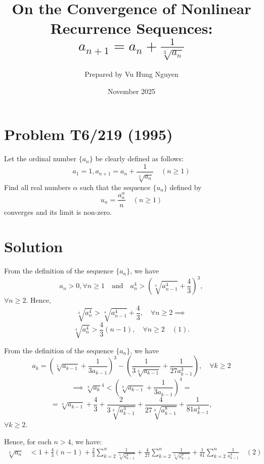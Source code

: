 \documentclass{article}
\title{On the Convergence of Nonlinear Recurrence Sequences:\\ $a_{n+1} = a_n + \frac{1}{\sqrt[3]{a_n}}$}
\author{Prepared by Vu Hung Nguyen}
\date{November 2025}
\begin{document}
\maketitle


\vspace{0.5cm}


\section{Problem T6/219 (1995)}

Let the ordinal number $\{a_n\}$ be clearly defined as follows:
$$ a_1 = 1, a_{n+1} = a_n + \frac{1}{\sqrt[3]{a_n}} \quad (n \ge 1) $$
Find all real numbers $\alpha$ such that the sequence $\{u_n\}$ defined by
$$ u_n = \frac{a_n^\alpha}{n} \quad (n \ge 1) $$
converges and its limit is non-zero.

\section*{Solution}
From the definition of the sequence $\{a_n\}$, we have
$$ a_n > 0, \forall n \ge 1 \quad \text{and} \quad a_n^4 > \left(\sqrt[4]{a_{n-1}^4} + \frac{4}{3}\right)^3, $$
$\forall n \ge 2$. Hence,
$$ \sqrt[4]{a_n^4} > \sqrt[4]{a_{n-1}^4} + \frac{4}{3}, \quad \forall n \ge 2 \implies $$
$$ \sqrt[4]{a_n^4} > \frac{4}{3}(n-1), \quad \forall n \ge 2 \quad (1). $$

From the definition of the sequence $\{a_n\}$, we have
$$ a_k = \left(\sqrt[3]{a_{k-1}} + \frac{1}{3a_{k-1}}\right)^3 - \left(\frac{1}{3\sqrt[3]{a_{k-1}}} + \frac{1}{27a_{k-1}^3}\right), \quad \forall k \ge 2 $$
$$\implies \sqrt[3]{a_k}^4 < \left(\sqrt[3]{a_{k-1}} + \frac{1}{3 a_{k-1}}\right)^4 = $$
$$ = \sqrt[3]{a_{k-1}} + \frac{4}{3} + \frac{2}{3\sqrt[3]{a_{k-1}^4}} + \frac{4}{27\sqrt[3]{a_{k-1}^8}} + \frac{1}{81a_{k-1}^4}, $$
$\forall k \ge 2$.

Hence, for each $n > 4$, we have:
\begin{align*}
\sqrt[3]{a_n} &< 1 + \frac{4}{3} (n-1) + 
\frac{2}{3}\sum_{k=2}^{n} \frac{1}{\sqrt[3]{a_{k-1}^4}} + 
\frac{4}{27}\sum_{k=2}^{n} \frac{1}{\sqrt[3]{a_{k-1}^8}} + 
\frac{1}{81}\sum_{k=2}^{n} \frac{1}{a_{k-1}^4} \quad (2)
\end{align*}
\end{document}
